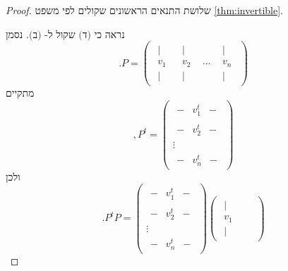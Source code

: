\documentclass[12pt]{report}
\theoremstyle{plain}
\theoremstyle{definition}
\newcommand{\0}{\mathbf{0}}
\begin{document}
\begin{proof}
שלושת התנאים הראשונים שקולים לפי משפט
\ref{thm:invertible}. 

נראה כי
$\text{(ד)}$
שקול ל-
$\text{(ב)}$. 
נסמן
$$
.P=\begin{pmatrix}
\begin{array}{c}
|\\[-0.4ex]
v_1\\[-0.4ex]
|
\end{array}
&
\begin{array}{c}
|\\[-0.4ex]
v_2\\[-0.4ex]
|
\end{array}
&
\cdots
&
\begin{array}{c}
|\\[-0.4ex]
v_n\\[-0.4ex]
|
\end{array}
\end{pmatrix}
$$
מתקיים
$$
,P^t =
\begin{pmatrix}
\begin{array}{ccc}
- & v_1^t & -
\end{array} \\[0.6ex]
\begin{array}{ccc}
- & v_2^t & -
\end{array} \\
\vdots \\
\begin{array}{ccc}
- & v_n^t & -
\end{array}
\end{pmatrix}
$$
ולכן
$$
.P^tP=\begin{pmatrix}
\begin{array}{ccc}
- & v_1^t & -
\end{array} \\[0.6ex]
\begin{array}{ccc}
- & v_2^t & -
\end{array} \\
\vdots \\
\begin{array}{ccc}
- & v_n^t & -
\end{array}
\end{pmatrix}\begin{pmatrix}
\begin{array}{c}
|\\[-0.4ex]
v_1\\[-0.4ex]
|
\end{array}
&
\begin{array}{c}

\end{array}
\end{pmatrix}$$
\end{proof}
\end{document}
